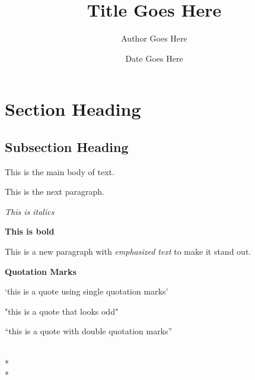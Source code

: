 \documentclass{article}
\title{Title Goes Here}
\author{Author Goes Here}
\date{Date Goes Here}
\begin{document}
\maketitle

\tableofcontents

\pagebreak

\section{Section Heading}
\subsection{Subsection Heading}

This is the main body of text. 

This is the next paragraph. 

\textit{This is italics}

\textbf{This is bold}

This is a new paragraph with \emph{emphasized text} to make it stand out. 

\textbf{Quotation Marks}

`this is a quote using single quotation marks'

"this is a quote that looks odd"

``this is a quote with double quotation marks''



\\*
\\*
\end{document}
